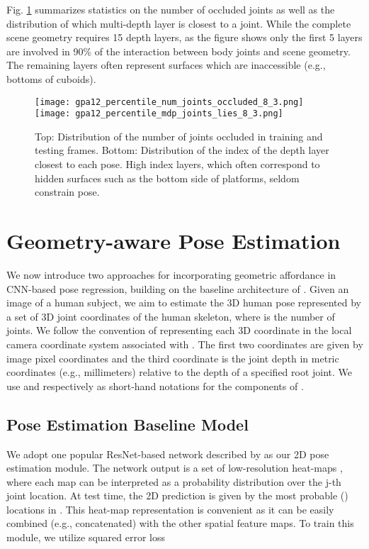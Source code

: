\documentclass[times,referee,twocolumn,final,authoryear]{elsarticle}
\begin{document}
Fig. \ref{fig:occlusion} summarizes statistics on the number of occluded joints 
as well as the distribution of which multi-depth layer is closest to a joint. 
While the complete scene geometry requires 15 depth layers, as the figure shows
only the first 5 layers are involved in 90\% of the interaction between body 
joints and scene geometry. The remaining layers often represent surfaces which are 
inaccessible (e.g., bottoms of cuboids).

\begin{figure}
\centering
\texttt{[image: gpa12\_percentile\_num\_joints\_occluded\_8\_3.png]}
\texttt{[image: gpa12\_percentile\_mdp\_joints\_lies\_8\_3.png]}
\caption{ Top: Distribution of the number of joints occluded in training and
testing frames. Bottom: Distribution of the index of the depth layer closest 
to each pose. High index layers, which often correspond to hidden surfaces such
as the bottom side of platforms, seldom constrain pose.}
\label{fig:occlusion}
\end{figure}


\section{Geometry-aware Pose Estimation}

We now introduce two approaches for incorporating geometric affordance in
CNN-based pose regression, building on the baseline architecture of
\cite{Zhou_2017_ICCV}.  Given an image  of a human subject, we aim to
estimate the 3D human pose represented by a set of 3D joint coordinates of the
human skeleton,  where  is the number of
joints.  We follow the convention of representing each 3D coordinate in
the local camera coordinate system associated with . The first two
coordinates are given by image pixel coordinates and the third coordinate is
the joint depth in metric coordinates (e.g., millimeters) relative to the
depth of a specified root joint. We use  and  respectively as 
short-hand notations for the components of .

\subsection{Pose Estimation Baseline Model}
We adopt one popular ResNet-based network described by \cite{xiao2018simple} 
as our 2D pose estimation module. The network output is a set of low-resolution
heat-maps , where each map
 can be interpreted as a probability distribution over the j-th joint
location.  At test time, the 2D prediction  is given by the most
probable () locations in .  This heat-map representation is
convenient as it can be easily combined (e.g., concatenated) with the other
spatial feature maps. To train this module, we utilize squared error loss 
\end{document}
